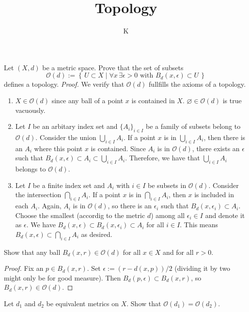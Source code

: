 \documentclass[a4paper]{article}
\title{Topology}
\author{K}
\newcommand{\makeset}[2]{\left\{\, #1 \mid #2 \,\right\}}
\begin{document}
    Let \((X, d)\) be a metric space. Prove that the set of subsets
    \begin{equation}
        \mathcal{O}(d) := \makeset{U \subset X}{\forall x \, \exists \epsilon > 0 \text{ with } B_d(x, \epsilon) \subset U}
    \end{equation}
    defines a topology.
    \newline
    \textit{Proof.} We verify that \(\mathcal{O}(d)\) fullfills the axioms of a topology.
    \begin{enumerate}
        \item \(X \in \mathcal{O}(d)\) since any ball of a point \(x\) is contained in \(X\). \(\varnothing \in \mathcal{O}(d)\) is true vacuously.
        \item Let \(I\) be an arbitary index set and \(\{A_i\}_{i \in I}\) be a family of subsets belong to \(\mathcal{O}(d)\). Consider the union \(\bigcup_{i \in I}A_i\). If a point \(x\) is in \(\bigcup_{i \in I}A_i\), then there is an \(A_i\) where this point \(x\) is contained. Since \(A_i\) is in \(\mathcal{O}(d)\), there exists an \(\epsilon\) such that \(B_d(x, \epsilon) \subset A_i \subset \bigcup_{i \in I}A_i\). Therefore, we have that \(\bigcup_{i \in I}A_i\) belongs to \(\mathcal{O}(d)\).
        \item Let \(I\) be a finite index set and \(A_i\) with \(i \in I\) be subsets in \(\mathcal{O}(d)\). Consider the intersection \(\bigcap_{i \in I}A_i\). If a point \(x\) is in \(\bigcap_{i \in I}A_i\), then \(x\) is included in each \(A_i\). Again, \(A_i\) is in \(\mathcal{O}(d)\), so there is an \(\epsilon_i\) such that \(B_d(x, \epsilon_i) \subset A_i\). Choose the smallest (accordig to the metric \(d\)) among all \(\epsilon_i \in I\) and denote it as \(\epsilon\). We have \(B_d(x, \epsilon) \subset B_d(x, \epsilon_i) \subset A_i\) for all \(i \in I\). This means \(B_d(x, \epsilon) \subset \bigcap_{i \in I}A_i\) as desired.
    \end{enumerate}

    Show that any ball \(B_d(x, r) \in \mathcal{O}(d)\) for all \(x \in X\) and for all \(r > 0\).
    \begin{proof}
        Fix an \(p \in B_d(x, r)\). Set \(\epsilon := (r - d(x, p)) / 2\) (dividing it by two might only be for good measure). Then \(B_d(p, \epsilon) \subset B_d(x, r)\), so \(B_d(x, r) \in \mathcal{O}(d)\).
    \end{proof}

    Let \(d_1\) and \(d_2\) be equivalent metrics on \(X\). Show that \(\mathcal{O}(d_1) = \mathcal{O}(d_2)\).
\end{document}
